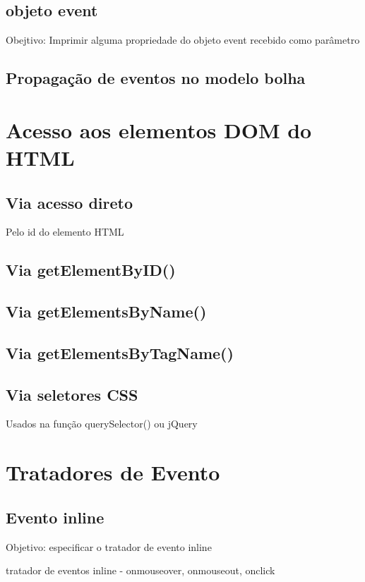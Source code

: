 \subsection{objeto event}
Obejtivo: Imprimir alguma propriedade do objeto event recebido como parâmetro

\subsection{Propagação de eventos no modelo bolha}

\section{Acesso aos elementos DOM do HTML }
\subsection{Via acesso direto}
 Pelo id do elemento HTML
\subsection{Via getElementByID()}


\subsection{Via getElementsByName()}



\subsection{Via getElementsByTagName()}



\subsection{Via seletores CSS}
  Usados na função querySelector() ou jQuery
  
\section{Tratadores de Evento}
\subsection{Evento inline}
Objetivo: especificar o tratador de evento inline

tratador de eventos inline - onmouseover, onmouseout, onclick




